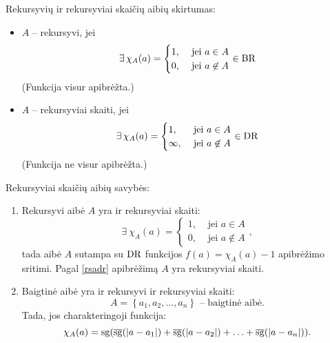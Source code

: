 \begin{note}
  Rekursyvių ir rekursyviai skaičių aibių skirtumas:
  \begin{itemize}
    \item $A$ – rekursyvi, jei 
      \[
      \exists \, \chi_{A}(a) =%
      \begin{cases}
        1, & \text{ jei } a \in A \\
        0, & \text{ jei } a \not \in A
      \end{cases}%
      \in \BR
      \]
      (Funkcija visur apibrėžta.)
    \item $A$ – rekursyviai skaiti, jei
      \[
      \exists \, \chi_{A}(a) =%
      \begin{cases}
        1, & \text{ jei } a \in A \\
        \infty, & \text{ jei } a \not \in A
      \end{cases}%
      \in \DR
      \]
      (Funkcija ne visur apibrėžta.)
  \end{itemize}
\end{note}

Rekursyviai skaičių aibių savybės:
\begin{enumerate}
  \item Rekursyvi aibė $A$ yra ir rekursyviai skaiti:
    \[
    \exists \: \chi_{A}(a) =%
    \begin{cases}
      1, & \text{ jei } a \in A \\
      0, & \text{ jei } a \not \in A
    \end{cases},
    \]
    tada aibė $A$ sutampa su $\mathop{\text{DR}}$ funkcijos $f(a) = \chi_{A}(a) - 1$
    apibrėžimo sritimi. Pagal \ref{rsadr} apibrėžimą $A$ yra 
    rekursyviai skaiti.
  \item Baigtinė aibė yra ir rekursyvi ir rekursyviai skaiti:
    \[
    A = \left\{ a_1, a_2, \dotsc, a_n \right\} \text{ – baigtinė aibė.}
    \]
    Tada, jos charakteringoji funkcija:
    \[
    \chi_{A}(a) = \sg(\sgi(|a - a_1|) + \sgi(|a - a_2|) + \dotsc +%
      \sgi(|a - a_n|)).
    \]
\end{enumerate}

